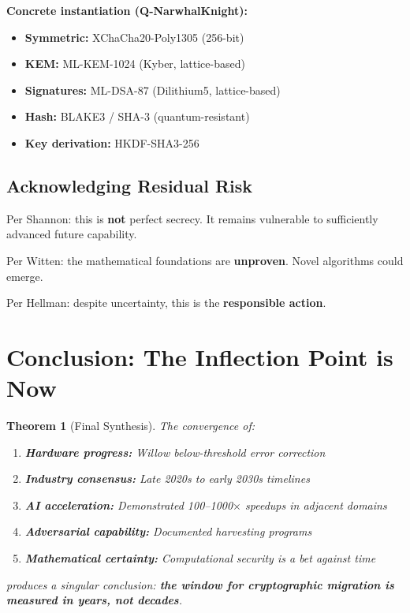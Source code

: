 \documentclass[11pt,a4paper]{article}
\newtheorem{theorem}{Theorem}[section]
\begin{document}
\textbf{Concrete instantiation (Q-NarwhalKnight):}
\begin{itemize}[noitemsep]
    \item \textbf{Symmetric:} XChaCha20-Poly1305 (256-bit)
    \item \textbf{KEM:} ML-KEM-1024 (Kyber, lattice-based)
    \item \textbf{Signatures:} ML-DSA-87 (Dilithium5, lattice-based)
    \item \textbf{Hash:} BLAKE3 / SHA-3 (quantum-resistant)
    \item \textbf{Key derivation:} HKDF-SHA3-256
\end{itemize}

\subsection{Acknowledging Residual Risk}

Per Shannon: this is \textbf{not} perfect secrecy. It remains vulnerable to sufficiently advanced future capability.

Per Witten: the mathematical foundations are \textbf{unproven}. Novel algorithms could emerge.

Per Hellman: despite uncertainty, this is the \textbf{responsible action}.

\section{Conclusion: The Inflection Point is Now}

\begin{theorem}[Final Synthesis]
The convergence of:
\begin{enumerate}[noitemsep]
    \item \textbf{Hardware progress:} Willow below-threshold error correction
    \item \textbf{Industry consensus:} Late 2020s to early 2030s timelines
    \item \textbf{AI acceleration:} Demonstrated 100--1000$\times$ speedups in adjacent domains
    \item \textbf{Adversarial capability:} Documented harvesting programs
    \item \textbf{Mathematical certainty:} Computational security is a bet against time
\end{enumerate}
produces a singular conclusion: \textbf{the window for cryptographic migration is measured in years, not decades}.
\end{theorem}
\end{document}
